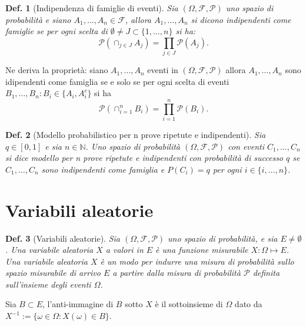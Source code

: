 \documentclass{article}
\newtheorem{definition}{Def.}[section]
\begin{document}
\begin{definition}[Indipendenza di famiglie di eventi]
Sia $(\Omega, \mathcal{F, P})$ uno spazio di probabilità e siano $A_1, \dots,
	A_n \in \mathcal{F}$, allora $A_1, \dots, A_n$ si dicono indipendenti come
	famiglie se per ogni scelta di $\emptyset \neq J \subset \{1, \dots, n\}$ si
	ha:
	\begin{equation}
		\mathcal{P}(\cap_{j \in J} A_j) = \prod_{j \in J} \mathcal{P}(A_j).
	\end{equation}
\end{definition}

Ne deriva la proprietà: siano $A_1, \dots, A_n$ eventi in $(\Omega, \mathcal{F,
P})$ allora $A_1, \dots, A_n$ sono idipendenti come famiglia se e solo se per
ogni scelta di eventi $B_1, \dots, B_n: B_i \in \{A_i, A_i^c\}$ si ha
\begin{equation}
	\mathcal{P}(\cap_{i=1}^n B_i) = \prod_{i = 1}^n \mathcal{P}(B_i).
\end{equation}

\begin{definition}[Modello probabilistico per n prove ripetute e indipendenti]
	Sia $q \in [0, 1]$ e sia $n \in \mathbb{N}$.
	Uno spazio di probabilità $(\Omega, \mathcal{F, P})$ con eventi $C_1, \dots,
	C_n$ si dice modello per n prove ripetute e indipendenti con probabilità
	di successo $q$ se\\

	$C_1, \dots, C_n$ sono indipendenti come famiglia e $P(C_i)=q$ per ogni
	$i\in\{i, \dots, n\}$.
\end{definition}

\section{Variabili aleatorie}
\begin{definition}[Variabili aleatorie]
	Sia $(\Omega, \mathcal{F, P})$ uno spazio di probabilità, e sia $E \neq
	\emptyset$. Una variabile aleatoria $X$ a valori in $E$ è una funzione
	misurabile $X: \Omega \mapsto E$.\\
	Una variabile aleatoria $X$ è un modo per indurre una misura di probabilità
	sullo spazio misurabile di arrivo $E$ a partire dalla misura di probabilità
	$\mathcal{P}$ definita sull'insieme degli eventi $\Omega$.
\end{definition}

Sia $B\subset E$, l'anti-immagine di $B$ sotto $X$ è il sottoinsieme di $\Omega$
dato da $X^{-1} := \{\omega \in \Omega: X(\omega) \in B\}$.
\end{document}
